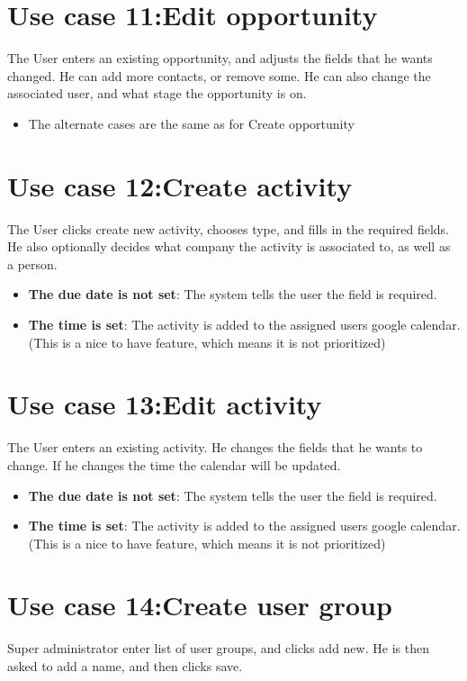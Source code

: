 \section{Use case 11:Edit opportunity }
\label{app:usecase:editopportunity}
The User enters an existing opportunity, and adjusts the fields that he wants
changed. He can add more contacts, or remove some. He can also change the
associated user, and what stage the opportunity is on. 

\begin{itemize}
  \item The alternate cases are the same as for Create opportunity 
\end{itemize}

\section{Use case 12:Create activity }
The User clicks create new activity, chooses type, and fills in the required
fields. He also optionally decides what company the activity is associated to,
as well as a person. 

\begin{itemize}
  \item \textbf{The due date is not set}: The system tells the user the field is
    required. 
  \item \textbf{The time is set}: The activity is added to the assigned users
    google calendar. (This is a nice to have feature, which means it is not
    prioritized) 
\end{itemize}

\section{Use case 13:Edit activity }
\label{app:usecase:editactivity}
The User enters an existing activity. He changes the fields that he wants to
change. If he changes the time the calendar will be updated. 

\begin{itemize}
  \item \textbf{The due date is not set}: The system tells the user the field is
    required. 
  \item \textbf{The time is set}: The activity is added to the assigned users
    google calendar. (This is a nice to have feature, which means it is not
    prioritized) 
\end{itemize}

\section{Use case 14:Create user group }
Super administrator enter list of user groups, and clicks add new. He is then
asked to add a name, and then clicks save. 


